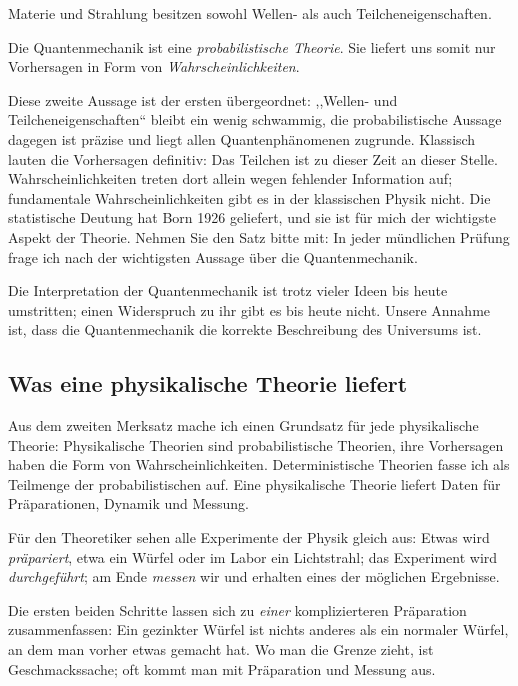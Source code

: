 \begin{merksatz}
Materie und Strahlung besitzen sowohl Wellen- als auch Teilcheneigenschaften.
\end{merksatz}

\begin{merksatz}
Die Quantenmechanik ist eine \emph{probabilistische Theorie}. Sie liefert uns somit nur Vorhersagen in Form von \emph{Wahrscheinlichkeiten}.
\end{merksatz}

Diese zweite Aussage ist der ersten übergeordnet: ,,Wellen- und Teilcheneigenschaften`` bleibt ein wenig schwammig, die probabilistische Aussage dagegen ist präzise und liegt allen Quantenphänomenen zugrunde. Klassisch lauten die Vorhersagen definitiv: Das Teilchen ist zu dieser Zeit an dieser Stelle. Wahrscheinlichkeiten treten dort allein wegen fehlender Information auf; fundamentale Wahrscheinlichkeiten gibt es in der klassischen Physik nicht. Die statistische Deutung hat Born 1926 geliefert, und sie ist für mich der wichtigste Aspekt der Theorie. Nehmen Sie den Satz bitte mit: In jeder mündlichen Prüfung frage ich nach der wichtigsten Aussage über die Quantenmechanik.

Die Interpretation der Quantenmechanik ist trotz vieler Ideen bis heute umstritten; einen Widerspruch zu ihr gibt es bis heute nicht. Unsere Annahme ist, dass die Quantenmechanik die korrekte Beschreibung des Universums ist.

\subsection{Was eine physikalische Theorie liefert}
Aus dem zweiten Merksatz mache ich einen Grundsatz für jede physikalische Theorie: Physikalische Theorien sind probabilistische Theorien, ihre Vorhersagen haben die Form von Wahrscheinlichkeiten. Deterministische Theorien fasse ich als Teilmenge der probabilistischen auf. Eine physikalische Theorie liefert Daten für Präparationen, Dynamik und Messung.

\begin{greybox}
Für den Theoretiker sehen alle Experimente der Physik gleich aus: Etwas wird \emph{präpariert}, etwa ein Würfel oder im Labor ein Lichtstrahl; das Experiment wird \emph{durchgeführt}; am Ende \emph{messen} wir und erhalten eines der möglichen Ergebnisse.

Die ersten beiden Schritte lassen sich zu \emph{einer} komplizierteren Präparation zusammenfassen: Ein gezinkter Würfel ist nichts anderes als ein normaler Würfel, an dem man vorher etwas gemacht hat. Wo man die Grenze zieht, ist Geschmackssache; oft kommt man mit Präparation und Messung aus.
\end{greybox}

